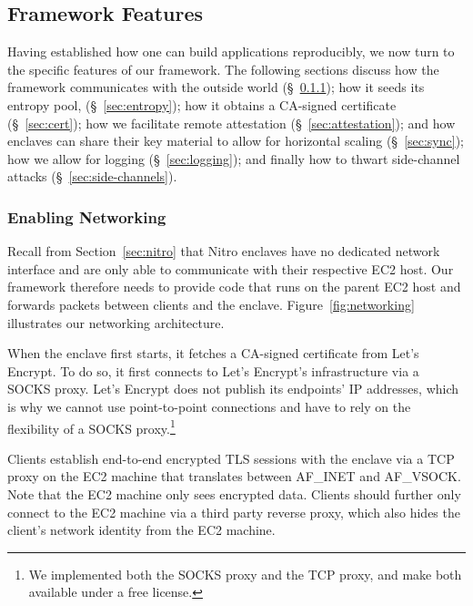 \subsection{Framework Features}
\label{sec:framework}

Having established how one can build applications reproducibly, we now turn to
the specific features of our framework.  The following sections discuss how the
framework communicates with the outside world (\S~\ref{sec:networking});
how it seeds its entropy pool, (\S~\ref{sec:entropy});
how it obtains a CA-signed certificate (\S~\ref{sec:cert});
how we facilitate remote attestation (\S~\ref{sec:attestation});
and how enclaves can share their key material to allow for horizontal scaling (\S~\ref{sec:sync});
how we allow for logging (\S~\ref{sec:logging});
and finally how to thwart side-channel attacks (\S~\ref{sec:side-channels}).


\subsubsection{Enabling Networking}
\label{sec:networking}

Recall from Section~\ref{sec:nitro} that Nitro enclaves have no dedicated
network interface and are only able to communicate with their respective EC2
host.  Our framework therefore needs to provide code that runs on the parent
EC2 host and forwards packets between clients and the enclave.
Figure~\ref{fig:networking} illustrates our networking architecture.

When the enclave first starts, it fetches a CA-signed certificate from Let's
Encrypt.  To do so, it first connects to Let's Encrypt's infrastructure via a
SOCKS proxy.  Let's Encrypt does not publish its endpoints' IP addresses, which
is why we cannot use point-to-point connections and have to rely on the
flexibility of a SOCKS proxy.\footnote{We implemented both the SOCKS proxy and
the TCP proxy, and make both available under a free license.}

Clients establish end-to-end encrypted TLS sessions with the enclave via a TCP
proxy on the EC2 machine that translates between AF\_INET and AF\_VSOCK.  Note
that the EC2 machine only sees encrypted data. Clients should further only
connect to the EC2 machine via a third party reverse proxy, which also hides
the client's network identity from the EC2 machine.

